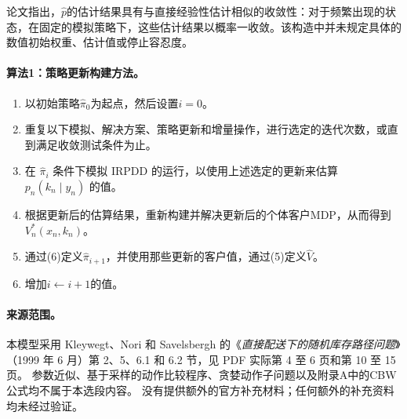 \documentclass{article}
\begin{document}
论文指出，$\hat p$的估计结果具有与直接经验性估计相似的收敛性：对于频繁出现的状态，在固定的模拟策略下，这些估计结果以概率一收敛。该构造中并未规定具体的数值初始权重、估计值或停止容忍度。

\paragraph{算法1：策略更新构建方法。}
\begin{enumerate}
\item 以初始策略$\hat\pi_0$为起点，然后设置$i=0$。
\item 重复以下模拟、解决方案、策略更新和增量操作，进行选定的迭代次数，或直到满足收敛测试条件为止。
\item 在 $\hat\pi_i$ 条件下模拟 IRPDD 的运行，以使用上述选定的更新来估算 $p_n(k_n\mid y_n)$ 的值。
\item 根据更新后的估算结果，重新构建并解决更新后的个体客户MDP，从而得到$V_n^*(x_n,k_n)$。
\item 通过(6)定义$\hat\pi_{i+1}$，并使用那些更新的客户值，通过(5)定义$\hat V$。
\item 增加$i\leftarrow i+1$的值。
\end{enumerate}

\paragraph{来源范围。}
本模型采用 Kleywegt、Nori 和 Savelsbergh 的《\emph{直接配送下的随机库存路径问题}》（1999 年 6 月）第 2、5、6.1 和 6.2 节，见 PDF 实际第 4 至 6 页和第 10 至 15 页。 参数近似、基于采样的动作比较程序、贪婪动作子问题以及附录A中的CBW公式均不属于本选段内容。 没有提供额外的官方补充材料；任何额外的补充资料均未经过验证。
\end{document}
